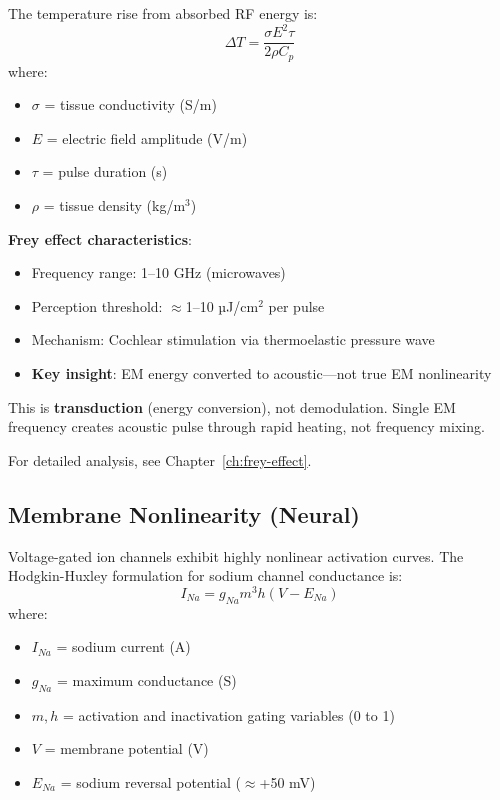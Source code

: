 \begin{scope}[shift={(8,0)}]
The temperature rise from absorbed RF energy is:
\begin{equation}
\label{eq:temperature-rise}
\Delta T = \frac{\sigma E^2 \tau}{2\rho C_p}
\end{equation}
where:
\begin{itemize}
\item $\sigma$ = tissue conductivity (S/m)
\item $E$ = electric field amplitude (V/m)
\item $\tau$ = pulse duration (s)
\item $\rho$ = tissue density (kg/m$^3$)
\end{itemize}

\textbf{Frey effect characteristics}:
\begin{itemize}
\item Frequency range: 1--10 GHz (microwaves)
\item Perception threshold: $\approx$1--10 µJ/cm$^2$ per pulse
\item Mechanism: Cochlear stimulation via thermoelastic pressure wave
\item \textbf{Key insight}: EM energy converted to acoustic---not true EM nonlinearity
\end{itemize}

\begin{warningbox}
This is \textbf{transduction} (energy conversion), not demodulation. Single EM frequency creates acoustic pulse through rapid heating, not frequency mixing.
\end{warningbox}

For detailed analysis, see Chapter~\ref{ch:frey-effect}.

\subsection{Membrane Nonlinearity (Neural)}

Voltage-gated ion channels exhibit highly nonlinear activation curves. The Hodgkin-Huxley formulation for sodium channel conductance is:
\begin{equation}
\label{eq:hh-conductance}
I_{Na} = g_{Na} m^3 h (V - E_{Na})
\end{equation}
where:
\begin{itemize}
\item $I_{Na}$ = sodium current (A)
\item $g_{Na}$ = maximum conductance (S)
\item $m, h$ = activation and inactivation gating variables (0 to 1)
\item $V$ = membrane potential (V)
\item $E_{Na}$ = sodium reversal potential ($\approx$+50 mV)
\end{itemize}


\end{scope}
